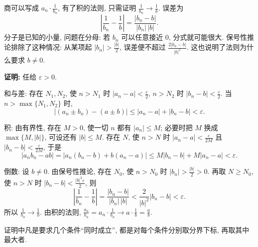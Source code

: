 \documentclass[UTF8,openany]{ctexbook}
\theoremstyle{chinesetextbook}
\newenvironment{cnproof}{\par\indent\textbf{证明:} \ignorespaces}{\par}
\begin{document}
商可以写成 $\displaystyle a_n\cdot\frac1{b_n}$, 有了积的法则, 只需证明 $\displaystyle\frac1{b_n}\to\frac1b$. 误差为
\[
\left|\frac1{b_n}-\frac1b\right|=\frac{|b_n-b|}{|b_n|\,|b|}.
\]
分子是已知的小量, 问题在分母: 若 $b_n$ 可以任意接近 $0$, 分式就可能很大. 保号性推论排除了这种情况: 从某项起 $\displaystyle|b_n|>\frac{|b|}2$, 误差便不超过 $\displaystyle\frac{2|b_n-b|}{|b|^2}$. 这也说明了法则为什么要求 $b\ne0$.
\begin{cnproof}
任给 $\varepsilon>0$.

和与差: 存在 $N_1,N_2$, 使 $n>N_1$ 时 $\displaystyle|a_n-a|<\frac\varepsilon2$, $n>N_2$ 时 $\displaystyle|b_n-b|<\frac\varepsilon2$. 当 $n>\max\{N_1,N_2\}$ 时,
\[
|(a_n\pm b_n)-(a\pm b)|\le|a_n-a|+|b_n-b|<\varepsilon.
\]

积: 由有界性, 存在 $M>0$, 使一切 $n$ 都有 $|a_n|\le M$; 必要时把 $M$ 换成 $\max\{M,|b|\}$, 可设还有 $|b|\le M$. 存在 $N$, 使 $n>N$ 时 $\displaystyle|a_n-a|<\frac\varepsilon{2M}$ 且 $\displaystyle|b_n-b|<\frac\varepsilon{2M}$, 于是
\[
|a_nb_n-ab|=|a_n(b_n-b)+b(a_n-a)|\le M|b_n-b|+M|a_n-a|<\varepsilon.
\]

倒数: 设 $b\ne0$. 由保号性推论, 存在 $N_0$, 使 $n>N_0$ 时 $\displaystyle|b_n|>\frac{|b|}2>0$. 再取 $N\ge N_0$, 使 $n>N$ 时 $\displaystyle|b_n-b|<\frac{|b|^2\varepsilon}2$, 则
\[
\left|\frac1{b_n}-\frac1b\right|=\frac{|b_n-b|}{|b_n|\,|b|}<\frac2{|b|^2}|b_n-b|<\varepsilon.
\]
所以 $\displaystyle\frac1{b_n}\to\frac1b$. 由积的法则, $\displaystyle\frac{a_n}{b_n}=a_n\cdot\frac1{b_n}\to a\cdot\frac1b=\frac ab$.
\end{cnproof}
证明中凡是要求几个条件“同时成立”, 都是对每个条件分别取分界下标, 再取其中最大者.
\end{document}
